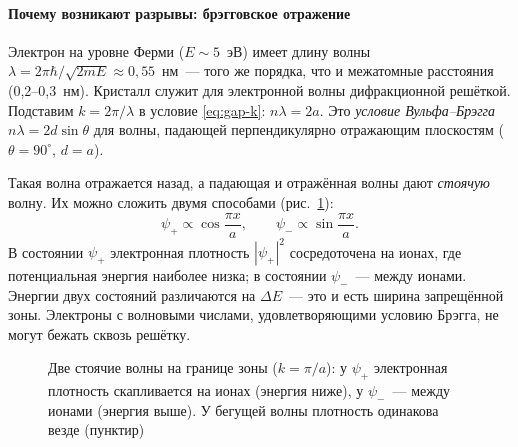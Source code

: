 \paragraph{Почему возникают разрывы: брэгговское отражение}
Электрон на уровне Ферми ($E\sim5$~эВ) имеет длину волны
$\lambda=2\pi\hbar/\sqrt{2mE}\approx0{,}55$~нм~— того же порядка, что и
межатомные расстояния (0,2--0,3~нм). Кристалл служит для электронной
волны дифракционной решёткой. Подставим $k=2\pi/\lambda$ в условие
\eqref{eq:gap-k}: $n\lambda=2a$. Это \emph{условие Вульфа--Брэгга}
$n\lambda=2d\sin\theta$ для волны, падающей перпендикулярно отражающим
плоскостям ($\theta=90^\circ$, $d=a$).

Такая волна отражается назад, а падающая и отражённая волны дают
\emph{стоячую} волну. Их можно сложить двумя способами
(рис.~\ref{fig:standing}):
\[
\psi_+\propto\cos\frac{\pi x}a,\qquad \psi_-\propto\sin\frac{\pi x}a .
\]
В состоянии $\psi_+$ электронная плотность $|\psi_+|^2$ сосредоточена на
ионах, где потенциальная энергия наиболее низка; в состоянии $\psi_-$~—
между ионами. Энергии двух состояний различаются на $\Delta E$~— это и
есть ширина запрещённой зоны. Электроны с волновыми числами,
удовлетворяющими условию Брэгга, не могут бежать сквозь решётку.

\begin{figure}[ht]
\centering
{}
\caption{Две стоячие волны на границе зоны ($k=\pi/a$): у $\psi_+$
электронная плотность скапливается на ионах (энергия ниже), у
$\psi_-$~— между ионами (энергия выше). У бегущей волны плотность
одинакова везде (пунктир)}
\label{fig:standing}
\end{figure}

